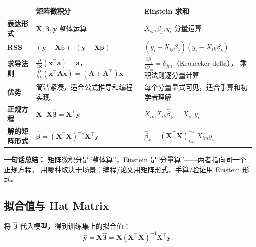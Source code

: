 \begin{center}
\renewcommand{\arraystretch}{1.6}
\begin{tabular}{p{3.5cm}|p{6cm}|p{6cm}}
\toprule
& \textbf{矩阵微积分} & \textbf{Einstein 求和} \\
\midrule
\textbf{表达形式}
    & $\mathbf{X}, \bm{\beta}, \mathbf{y}$ 整体运算
    & $X_{ij}, \beta_j, y_i$ 分量运算 \\
\midrule
\textbf{RSS}
    & $(\mathbf{y} - \mathbf{X}\bm{\beta})^\top (\mathbf{y} - \mathbf{X}\bm{\beta})$
    & $(y_i - X_{ij}\beta_j)(y_i - X_{ik}\beta_k)$ \\
\midrule
\textbf{求导法则}
    & $\frac{\partial}{\partial \mathbf{x}}(\mathbf{x}^\top \mathbf{a}) = \mathbf{a}$，
      $\frac{\partial}{\partial \mathbf{x}}(\mathbf{x}^\top \mathbf{A}\mathbf{x}) = (\mathbf{A}+\mathbf{A}^\top)\mathbf{x}$
    & $\frac{\partial \beta_j}{\partial \beta_m} = \delta_{jm}$（Kronecker delta），
      乘积法则逐分量计算 \\
\midrule
\textbf{优势}
    & 简洁紧凑，适合公式推导和编程实现
    & 每个分量显式可见，适合手算和初学者理解 \\
\midrule
\textbf{正规方程}
    & $\mathbf{X}^\top \mathbf{X}\hat{\bm{\beta}} = \mathbf{X}^\top \mathbf{y}$
    & $X_{im}X_{ik}\hat{\beta}_k = X_{im}y_i$ \\
\midrule
\textbf{解的矩阵形式}
    & $\hat{\bm{\beta}} = (\mathbf{X}^\top \mathbf{X})^{-1}\mathbf{X}^\top \mathbf{y}$
    & $\hat{\beta}_k = (\mathbf{X}^\top \mathbf{X})^{-1}_{km}\,X_{im}y_i$ \\
\bottomrule
\end{tabular}
\end{center}

\medskip
\textbf{一句话总结：}
矩阵微积分是``整体算''，Einstein 是``分量算''——两者指向同一个正规方程。
用哪种取决于场景：编程/论文用矩阵形式，手算/验证用 Einstein 形式。

\subsection{拟合值与 Hat Matrix}

\begin{definition}[拟合值]
将 $\hat{\bm{\beta}}$ 代入模型，得到训练集上的拟合值：
\begin{equation}\label{eq:fitted_values}
    \hat{\mathbf{y}} = \mathbf{X} \hat{\bm{\beta}}
    = \mathbf{X} (\mathbf{X}^\top \mathbf{X})^{-1} \mathbf{X}^\top \mathbf{y}.
\end{equation}
\end{definition}

